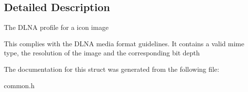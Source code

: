 \subsection{Detailed Description}
The DLNA profile for a icon image

This complies with the DLNA media format guidelines. It contains a valid mime type, the resolution of the image and the corresponding bit depth 

The documentation for this struct was generated from the following file:\begin{CompactItemize}
\item 
common.h\end{CompactItemize}
